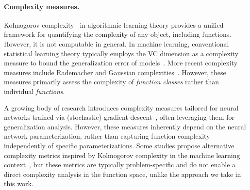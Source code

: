 \paragraph{Complexity measures.} Kolmogorov complexity~\citep{li2008introduction} in algorithmic learning theory provides a unified framework for quantifying the complexity of any object, including functions. However, it is not computable in general. In machine learning, conventional statistical learning theory typically employs the VC dimension as a complexity measure to bound the generalization error of models~\citep{vapnik_nature_1999}. More recent complexity measures include Rademacher and Gaussian complexities~\citep{bartlett_rademacher_2002}. However, these measures primarily assess the complexity of \emph{function classes} rather than individual \emph{functions}.

A growing body of research introduces complexity measures tailored for neural networks trained via (stochastic) gradient descent~\citep{bartlett_spectrally-normalized_2017,jacot_neural_2018,zhou_non-vacuous_2019,lotfi_pac-bayes_2022,chatterjee_neural_2024}, often leveraging them for generalization analysis. However, these measures inherently depend on the neural network parameterization, rather than capturing function complexity independently of specific parameterizations. Some studies propose alternative complexity metrics inspired by Kolmogorov complexity in the machine learning context~\citep{xu_what_2020,liu_grokking_2023}, but these metrics are typically problem-specific and do not enable a direct complexity analysis in the function space, unlike the approach we take in this work.



